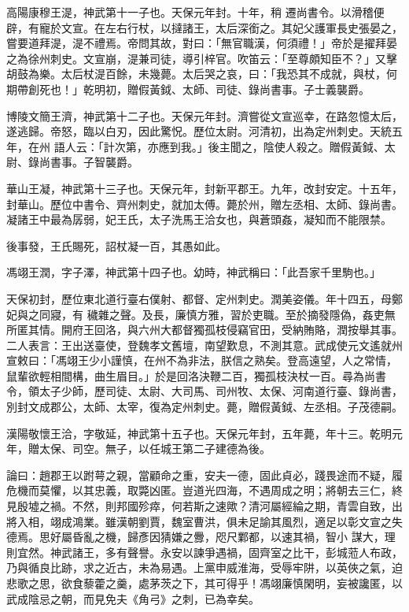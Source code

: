 \begin{pinyinscope}
 高陽康穆王湜，神武第十一子也。天保元年封。十年，稍
 遷尚書令。以滑稽便辟，有寵於文宣。在左右行杖，以撻諸王，太后深銜之。其妃父護軍長史張晏之，嘗要道拜湜，湜不禮焉。帝問其故，對曰：「無官職漢，何須禮！」帝於是擢拜晏之為徐州刺史。文宣崩，湜兼司徒，導引梓官。吹笛云：「至尊頗知臣不？」又擊胡鼓為樂。太后杖湜百餘，未幾薨。太后哭之哀，曰：「我恐其不成就，與杖，何期帶創死也！」乾明初，贈假黃鉞、太師、司徒、錄尚書事。子士義襲爵。



 博陵文簡王濟，神武第十二子也。天保元年封。濟嘗從文宣巡幸，在路忽憶太后，遂逃歸。帝怒，臨以白刃，因此驚怳。歷位太尉。河清初，出為定州刺史。天統五年，在州
 語人云：「計次第，亦應到我。」後主聞之，陰使人殺之。贈假黃鉞、太尉、錄尚書事。子智襲爵。



 華山王凝，神武第十三子也。天保元年，封新平郡王。九年，改封安定。十五年，封華山。歷位中書令、齊州刺史，就加太傅。薨於州，贈左丞相、太師、錄尚書。凝諸王中最為孱弱，妃王氏，太子洗馬王洽女也，與蒼頭姦，凝知而不能限禁。



 後事發，王氏賜死，詔杖凝一百，其愚如此。



 馮翊王潤，字子澤，神武第十四子也。幼時，神武稱曰：「此吾家千里駒也。」



 天保初封，歷位東北道行臺右僕射、都督、定州刺史。潤美姿儀。年十四五，母鄭妃與之同寢，有
 穢雜之聲。及長，廉慎方雅，習於吏職。至於摘發隱偽，姦吏無所匿其情。開府王回洛，與六州大都督獨孤枝侵竊官田，受納賄賂，潤按舉其事。二人表言：王出送臺使，登魏孝文舊壇，南望歎息，不測其意。武成使元文遙就州宣敕曰：「馮翊王少小謹慎，在州不為非法，朕信之熟矣。登高遠望，人之常情，鼠輩欲輕相間構，曲生眉目。」於是回洛決鞭二百，獨孤枝決杖一百。尋為尚書令，領太子少師，歷司徒、太尉、大司馬、司州牧、太保、河南道行臺、錄尚書，別封文成郡公，太師、太宰，復為定州刺史。薨，贈假黃鉞、左丞相。子茂德嗣。



 漢陽敬懷王洽，字敬延，神武第十五子也。天保元年封，五年薨，年十三。乾明元年，贈太保、司空。無子，以任城王第二子建德為後。



 論曰：趙郡王以跗萼之親，當顧命之重，安夫一德，固此貞必，踐畏途而不疑，履危機而莫懼，以其忠義，取斃凶匿。豈道光四海，不遇周成之明；將朝去三仁，終見殷墟之禍。不然，則邦國殄瘁，何若斯之速歟？清河屬經綸之期，青雲自致，出將入相，翊成鴻業。雖漢朝劉賈，魏室曹洪，俱未足諭其風烈，適足以彰文宣之失德焉。思好屬昏亂之機，歸彥因猜嫌之釁，咫尺鄴都，以速其禍，智小
 謀大，理則宜然。神武諸王，多有聲譽。永安以諫爭遇禍，固齊室之比干，彭城蒞人布政，乃與循良比跡，求之近古，未為易遇。上黨申威淮海，受辱牢阱，以英俠之氣，迫悲歌之思，欲食藜藿之羹，處茅茨之下，其可得乎！馮翊廉慎閑明，妄被讒匿，以武成陰忌之朝，而見免夫《角弓》之刺，已為幸矣。



\end{pinyinscope}
